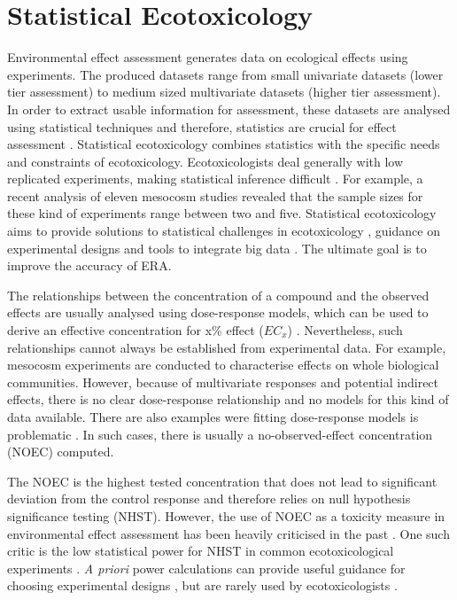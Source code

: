 \section{Statistical Ecotoxicology}

Environmental effect assessment generates data on ecological effects using experiments. 
The produced datasets range from small univariate datasets (lower tier assessment) to medium sized multivariate datasets (higher tier assessment).
In order to extract usable information for assessment, these datasets are analysed using statistical techniques and therefore, statistics are crucial for effect assessment \citep{newman_quantitative_2012}.
Statistical ecotoxicology combines statistics with the specific needs and constraints of ecotoxicology. 
Ecotoxicologists deal generally with low replicated experiments, making statistical inference difficult \citep{van_der_hoeven_power_1998}.
For example, a recent analysis of eleven mesocosm studies revealed that the sample sizes for these kind of experiments range between two and five.
Statistical ecotoxicology aims to provide solutions to statistical challenges in ecotoxicology \citep{fox_comment_2016}, guidance on experimental designs \citep{johnson_power_2015} and tools to integrate big data \citep {van_den_brink_new_2016}.
The ultimate goal is to improve the accuracy of ERA. 

The relationships between the concentration of a compound and the observed effects are usually analysed using dose-response models, which can be used to derive an effective concentration for x\% effect ($EC_{x}$) \citep{ritz_toward_2010}. 
Nevertheless, such relationships cannot always be established from experimental data.
For example, mesocosm experiments are conducted to characterise effects on whole biological communities.
However, because of multivariate responses and potential indirect effects, there is no clear dose-response relationship and no models for this kind of data available. 
There are also examples were fitting dose-response models is problematic \citep{green_issues_2016}. 
In such cases, there is usually a no-observed-effect concentration (NOEC) computed. 

The NOEC is the highest tested concentration that does not lead to significant deviation from the control response and therefore relies on null hypothesis significance testing (NHST). 
However, the use of NOEC as a toxicity measure in environmental effect assessment has been heavily criticised in the past \citep{laskowski_good_1995, chapman_warning:_1996, warne_noec_2008, fox_what_2012, jager_bad_2012, fox_dont_2016}. 
One such critic is the low statistical power for NHST in common ecotoxicological experiments \citep{van_der_hoeven_power_1998}.
\emph{A priori} power calculations can provide useful guidance for choosing experimental designs \citep{johnson_power_2015}, but are rarely used by ecotoxicologists \citep{newman_what_2008}. 

